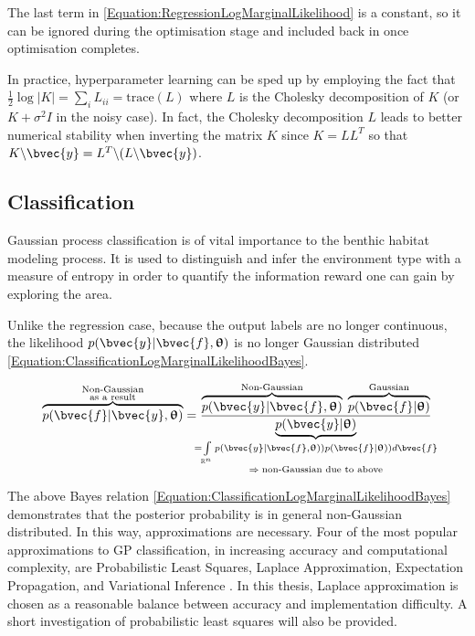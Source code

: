 				The last term in \eqref{Equation:RegressionLogMarginalLikelihood} is a constant, so it can be ignored during the optimisation stage and included back in once optimisation completes.
				
				In practice, hyperparameter learning can be sped up by employing the fact that $\frac{1}{2} \log|K| = \sum_{i} L_{ii} = \mathrm{trace}(L)$ where $L$ is the Cholesky decomposition of $K$ (or $K + \sigma^{2} I$ in the noisy case). In fact, the Cholesky decomposition $L$ leads to better numerical stability when inverting the matrix $K$ since $K = LL^{T}$ so that $K \backslash \bvec{y} = L^{T} \backslash (L \backslash \bvec{y})$.
				
		\subsection{Classification}
		\label{Background:GaussianProcesses:Classification}
		
			Gaussian process classification is of vital importance to the benthic habitat modeling process. It is used to distinguish and infer the environment type with a measure of entropy in order to quantify the information reward one can gain by exploring the area.
			
			Unlike the regression case, because the output labels are no longer continuous, the likelihood $p(\bvec{y} | \bvec{f}, \vec{\uptheta})$ is no longer Gaussian distributed \eqref{Equation:ClassificationLogMarginalLikelihoodBayes}.

			\begin{equation}
				\overbrace{p(\bvec{f} | \bvec{y}, \vec{\uptheta})}^{\mathclap{\substack{\text{Non-Gaussian} \\ \text{as a result}}}} = \frac{\overbrace{p(\bvec{y} | \bvec{f}, \vec{\uptheta})}^{\text{Non-Gaussian}} \; \overbrace{p(\bvec{f} | \vec{\uptheta})}^{\text{Gaussian}}}{\underbrace{p(\bvec{y} | \vec{\uptheta})}_{\mathclap{\substack{= \int\limits_{\mathbb{R}^{n}} p(\bvec{y} | \bvec{f}, \vec{\uptheta})) p(\bvec{f} | \vec{\uptheta})) d\bvec{f} \\ \Rightarrow \; \text{non-Gaussian due to above}}}}}
			\label{Equation:ClassificationLogMarginalLikelihoodBayes}
			\end{equation}

			The above Bayes relation \eqref{Equation:ClassificationLogMarginalLikelihoodBayes} demonstrates that the posterior probability is in general non-Gaussian distributed. In this way, approximations are necessary. Four of the most popular approximations to GP classification, in increasing accuracy and computational complexity, are Probabilistic Least Squares, Laplace Approximation, Expectation Propagation, and Variational Inference \citep{GaussianProcessForMachineLearning}. In this thesis, Laplace approximation is chosen as a reasonable balance between accuracy and implementation difficulty. A short investigation of probabilistic least squares will also be provided.
			
